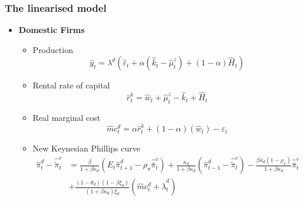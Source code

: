 \documentclass[9pt]{beamer}
\begin{document}
\begin{frame}[noframenumbering]
\frametitle{The linearised model}
\begin{itemize}
    \label{DomUnit}
    \item \textbf{Domestic Firms}
    \begin{itemize}
        \item Production
    $$
    \hat{y}_{t}=\lambda^{d}\left(\hat{\varepsilon}_{t}+\alpha\left(\hat{k}_{t}-\hat{\mu}_{t}^{z}\right)+(1-\alpha) \hat{H}_{t}\right)
    $$
    
    \item Rental rate of capital
    $$
    \hat{r}_{t}^{k}=\hat{w}_{t}+\hat{\mu}_{t}^{z}-\hat{k}_{t}+\hat{H}_{t}
    $$
    
    \item Real marginal cost
    $$
    \hat{m} c_{t}^{d}=\alpha \hat{r}_{t}^{k}+(1-\alpha)\left(\hat{w}_{t}\right)-\hat{\varepsilon}_{t}
    $$
    
    \item New Keynesian Phillips curve
    $$
    \begin{aligned}
    \hat{\pi}_{t}^{d}-\hat{\tilde{\pi}}_{t}^{c} &=\frac{\beta}{1+\beta \kappa_{d}}\left(E_{t} \hat{\pi}_{t+1}^{d}-\rho_{\pi} \hat{\bar{\pi}}_{t}^{c}\right)+\frac{\kappa_{d}}{1+\beta \kappa_{d}}\left(\hat{\pi}_{t-1}^{d}-\hat{\tilde{\pi}}_{t}^{c}\right)-\frac{\beta \kappa_{d}\left(1-\rho_{\pi}\right)}{1+\beta \kappa_{d}} \hat{\bar{\pi}}_{t}^{c} \\
    &+\frac{\left(1-\theta_{d}\right)\left(1-\beta \xi_{d}\right)}{\left(1+\beta \kappa_{d}\right) \xi_{d}}\left(\hat{m} c_{t}^{d}+\hat{\lambda}_{t}^{d}\right)
    \end{aligned}
    $$
    \end{itemize}
    
    
\end{itemize}
    
    \hyperlink{frame1}{}


\end{frame}
\end{document}

